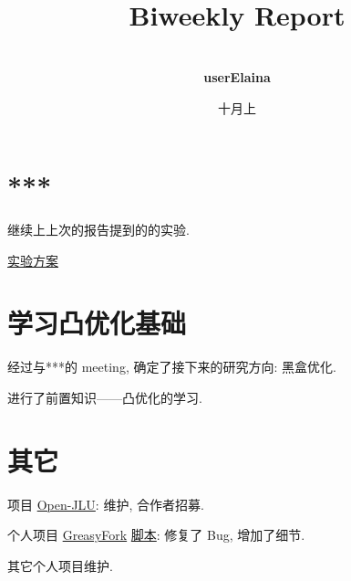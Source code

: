 \documentclass[a4paper]{article}
\title{
    \vspace*{1.0in}
     \\
    \vspace*{1in}
    \textbf{\Huge Biweekly Report}
    \vspace{0.5in}
}
\author{ \\
    \textbf{\huge userElaina} \\
    \vspace*{1in}
}
\date{\LARGE 十月上}
\begin{document}
\LARGE

\maketitle
\tableofcontents
\thispagestyle{empty}
\newpage

\section{***}

继续上上次的报告提到的的实验.

\href{https://www.overleaf.com/project/64fdf0c42ddf7bc3a46879ea}{实验方案}

\section{学习凸优化基础}

经过与***的 meeting, 确定了接下来的研究方向: 黑盒优化.

进行了前置知识——凸优化的学习.

\section{其它}

项目 \href{https://github.com/userElaina/Open-JLU}{Open-JLU}: 维护, 合作者招募.

个人项目 \href{https://greasyfork.org/zh-CN/scripts/461427-%E5%9B%BD%E9%99%85%E7%BD%91%E7%AB%99-%E4%BC%AA%E8%A3%85%E6%88%90-%E5%9B%BD%E5%86%85%E7%BD%91%E7%AB%99-%E6%B1%87%E6%80%BB}{GreasyFork} \href{https://github.com/userElaina/this-is-the-China-website}{脚本}: 修复了 Bug, 增加了细节.

其它个人项目维护.
\end{document}
